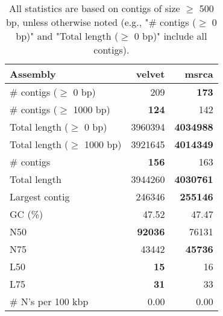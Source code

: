 \documentclass[12pt,a4paper]{article}
\begin{document}
\begin{table}[ht]
\begin{center}
\caption{All statistics are based on contigs of size $\geq$ 500 bp, unless otherwise noted (e.g., "\# contigs ($\geq$ 0 bp)" and "Total length ($\geq$ 0 bp)" include all contigs).}
\begin{tabular}{|l*{2}{|r}|}
\hline
Assembly & velvet & msrca \\ \hline
\# contigs ($\geq$ 0 bp) & 209 & {\bf 173} \\ \hline
\# contigs ($\geq$ 1000 bp) & {\bf 124} & 142 \\ \hline
Total length ($\geq$ 0 bp) & 3960394 & {\bf 4034988} \\ \hline
Total length ($\geq$ 1000 bp) & 3921645 & {\bf 4014349} \\ \hline
\# contigs & {\bf 156} & 163 \\ \hline
Total length & 3944260 & {\bf 4030761} \\ \hline
Largest contig & 246346 & {\bf 255146} \\ \hline
GC (\%) & 47.52 & 47.47 \\ \hline
N50 & {\bf 92036} & 76131 \\ \hline
N75 & 43442 & {\bf 45736} \\ \hline
L50 & {\bf 15} & 16 \\ \hline
L75 & {\bf 31} & 33 \\ \hline
\# N's per 100 kbp & 0.00 & 0.00 \\ \hline
\end{tabular}
\end{center}
\end{table}
\end{document}
